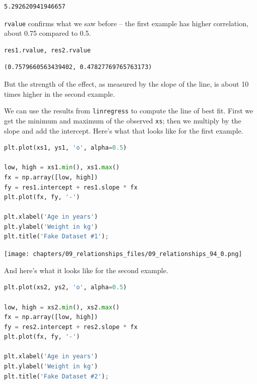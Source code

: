 \begin{lstlisting}[style=output]
5.292620941946657
\end{lstlisting}

\passthrough{\lstinline!rvalue!} confirms what we saw before -- the
first example has higher correlation, about 0.75 compared to 0.5.

\begin{lstlisting}[language=Python,style=source]
res1.rvalue, res2.rvalue
\end{lstlisting}

\begin{lstlisting}[style=output]
(0.7579660563439402, 0.47827769765763173)
\end{lstlisting}

But the strength of the effect, as measured by the slope of the line, is
about 10 times higher in the second example.

We can use the results from \passthrough{\lstinline!linregress!} to
compute the line of best fit. First we get the minimum and maximum of
the observed \passthrough{\lstinline!xs!}; then we multiply by the slope
and add the intercept. Here's what that looks like for the first
example.

\begin{lstlisting}[language=Python,style=source]
plt.plot(xs1, ys1, 'o', alpha=0.5)

low, high = xs1.min(), xs1.max()
fx = np.array([low, high])
fy = res1.intercept + res1.slope * fx
plt.plot(fx, fy, '-')

plt.xlabel('Age in years')
plt.ylabel('Weight in kg')
plt.title('Fake Dataset #1');
\end{lstlisting}

\begin{center}
\texttt{[image: chapters/09\_relationships\_files/09\_relationships\_94\_0.png]}
\end{center}

And here's what it looks like for the second example.

\begin{lstlisting}[language=Python,style=source]
plt.plot(xs2, ys2, 'o', alpha=0.5)

low, high = xs2.min(), xs2.max()
fx = np.array([low, high])
fy = res2.intercept + res2.slope * fx
plt.plot(fx, fy, '-')

plt.xlabel('Age in years')
plt.ylabel('Weight in kg')
plt.title('Fake Dataset #2');
\end{lstlisting}

